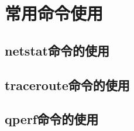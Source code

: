 \chapter{常用命令使用}
\label{sec:BasicCommand}











% 





























\section{netstat命令的使用}
\label{sec:netstatCmd}



\section{traceroute命令的使用}
\label{sec:tracerouteCmd}







\section{qperf命令的使用}
\label{sec:qperfCmd}


